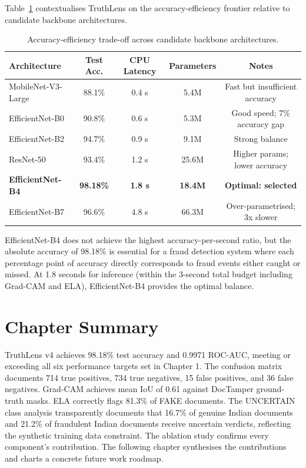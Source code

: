 \documentclass[12pt,a4paper,oneside]{report}
\begin{document}
Table~\ref{tab:efficiency} contextualises TruthLens on the accuracy-efficiency frontier
relative to candidate backbone architectures.

\begin{table}[H]
\centering
\caption{Accuracy-efficiency trade-off across candidate backbone architectures.}
\label{tab:efficiency}
\renewcommand{\arraystretch}{1.3}
\begin{tabular}{lcccc}
\toprule
\textbf{Architecture} & \textbf{Test Acc.} & \textbf{CPU Latency} &
\textbf{Parameters} & \textbf{Notes} \\
\midrule
MobileNet-V3-Large   & 88.1\% & 0.4 s & 5.4M  & Fast but insufficient accuracy \\
EfficientNet-B0      & 90.8\% & 0.6 s & 5.3M  & Good speed; 7\% accuracy gap \\
EfficientNet-B2      & 94.7\% & 0.9 s & 9.1M  & Strong balance \\
ResNet-50            & 93.4\% & 1.2 s & 25.6M & Higher params; lower accuracy \\
\textbf{EfficientNet-B4} & \textbf{98.18\%} & \textbf{1.8 s} & \textbf{18.4M} & \textbf{Optimal: selected} \\
EfficientNet-B7      & 96.6\% & 4.8 s & 66.3M & Over-parametrised; 3x slower \\
\bottomrule
\end{tabular}
\end{table}

EfficientNet-B4 does not achieve the highest accuracy-per-second ratio, but the
absolute accuracy of 98.18\% is essential for a fraud detection system where
each percentage point of accuracy directly corresponds to fraud events either
caught or missed. At 1.8 seconds for inference (within the 3-second total budget
including Grad-CAM and ELA), EfficientNet-B4 provides the optimal balance.


\section{Chapter Summary}

TruthLens v4 achieves 98.18\% test accuracy and 0.9971 ROC-AUC, meeting or
exceeding all six performance targets set in Chapter 1. The confusion matrix
documents 714 true positives, 734 true negatives, 15 false positives, and 36
false negatives. Grad-CAM achieves mean IoU of 0.61 against DocTamper ground-truth
masks. ELA correctly flags 81.3\% of FAKE documents. The UNCERTAIN class analysis
transparently documents that 16.7\% of genuine Indian documents and 21.2\% of
fraudulent Indian documents receive uncertain verdicts, reflecting the synthetic
training data constraint. The ablation study confirms every component's
contribution. The following chapter synthesises the contributions and charts a
concrete future work roadmap.
\end{document}
